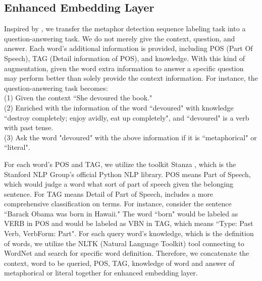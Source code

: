 \documentclass[11pt,a4paper]{article}
\begin{document}
\subsection{Enhanced Embedding Layer}
Inspired by \citet{mccann2018natural}, we transfer the metaphor detection sequence labeling task into a question-answering task. We do not merely give the context, question, and answer. Each word's additional information is provided, including POS (Part Of Speech), TAG (Detail information of POS), and knowledge. With this kind of augmentation, given the word extra information to answer a specific question may perform better than solely provide the context information. 
For instance, the question-answering task becomes: \\
(1) Given the context ``She devoured the book."\\
(2) Enriched with the information of the word ``devoured" with knowledge ``destroy completely; enjoy avidly, eat up completely", and ``devoured" is a verb with past tense.\\
(3) Ask the word "devoured" with the above information if it is ``metaphorical" or ``literal".

For each word's POS and TAG, we utilize the toolkit Stanza \cite{qi2020stanza}, which is the Stanford NLP Group's official Python NLP library. POS means Part of Speech, which would judge a word what sort of part of speech given the belonging sentence. For TAG means Detail of Part of Speech, includes a more comprehensive classification on terms. For instance, consider the sentence ``Barack Obama was born in Hawaii." The word ``born" would be labeled as VERB in POS and would be labeled as VBN in TAG, which means ``Type: Past Verb, VerbForm: Part". For each query word's knowledge, which is the definition of words, we utilize the NLTK (Natural Language Toolkit) tool connecting to WordNet and search for specific word definition. Therefore, we concatenate the context, word to be queried, POS, TAG, knowledge of word and answer of metaphorical or literal together for enhanced embedding layer.

\end{document}

